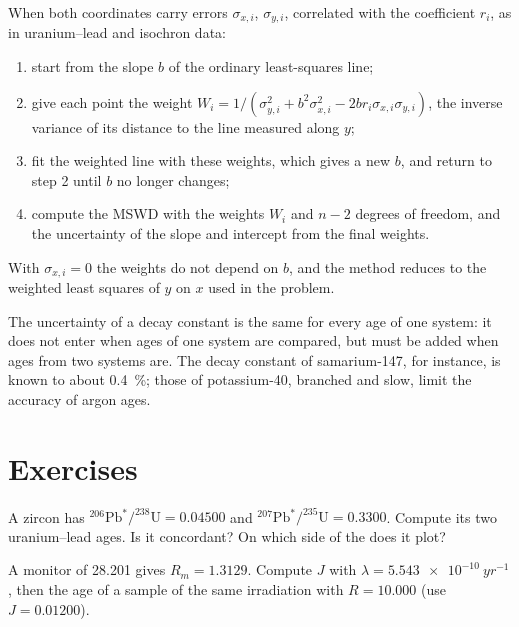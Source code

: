 \begin{method}\label{met:b3:advanced-geochronology:york}
When both coordinates carry errors $\sigma_{x,i}$, $\sigma_{y,i}$, correlated
with the coefficient $r_i$, as in uranium--lead and isochron data:
\begin{enumerate}
\item start from the slope $b$ of the ordinary least-squares line;
\item give each point the weight $W_i = 1/(\sigma_{y,i}^2 + b^2\sigma_{x,i}^2 -
2br_i\sigma_{x,i}\sigma_{y,i})$, the inverse variance of its distance to the
line measured along $y$;
\item fit the weighted line with these weights, which gives a new $b$, and
return to step 2 until $b$ no longer changes;
\item compute the MSWD with the weights $W_i$ and $n - 2$ degrees of freedom,
and the uncertainty of the slope and intercept from the final weights.
\end{enumerate}
With $\sigma_{x,i} = 0$ the weights do not depend on $b$, and the method
reduces to the weighted least squares of $y$ on $x$ used in the problem.
\end{method}

The uncertainty of a decay constant is the same for every age of one system:
it does not enter when ages of one system are compared, but must be added
when ages from two systems are. The decay constant of samarium-147, for
instance, is known to about \qty{0.4}{\percent}; those of potassium-40,
branched and slow, limit the accuracy of argon ages.


\section{Exercises}

\begin{exercise}[$\star$]\label{exo:b3:advanced-geochronology:1}
A zircon has $^{206}\mathrm{Pb}^*/^{238}\mathrm{U} = 0.04500$ and
$^{207}\mathrm{Pb}^*/^{235}\mathrm{U} = 0.3300$. Compute its two
uranium--lead ages. Is it concordant? On which side of the  does it
plot?
\end{exercise}

\begin{exercise}[$\star$]\label{exo:b3:advanced-geochronology:2}
A monitor of \qty{28.201}{\Ma} gives $R_m = 1.3129$. Compute $J$ with $\lambda
= \qty{5.543e-10}{yr^{-1}}$, then the age of a sample of the same irradiation
with $R = 10.000$ (use $J = 0.01200$).
\end{exercise}

